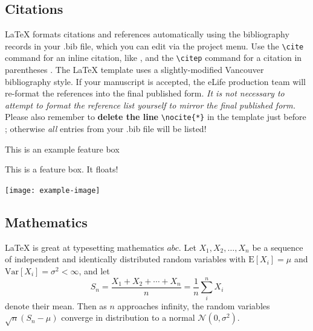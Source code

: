 \documentclass[9pt,lineno]{elife}
\begin{document}
\subsection{Citations}

LaTeX formats citations and references automatically using the bibliography records in your .bib file, which you can edit via the project menu. Use the \verb|\cite| command for an inline citation, like \cite{Aivazian917}, and the \verb|\citep| command for a citation in parentheses \citep{Aivazian917}. The LaTeX template uses a slightly-modified Vancouver bibliography style. If your manuscript is accepted, the eLife production team will re-format the references into the final published form. \emph{It is not necessary to attempt to format the reference list yourself to mirror the final published form.} Please also remember to \textbf{delete the line} \verb|\nocite{*}| in the template just before \verb||; otherwise \emph{all} entries from your .bib file will be listed! 

\begin{featurebox}
\caption{This is an example feature box}
\label{box:simple}
This is a feature box. It floats!
\medskip

\texttt{[image: example-image]}

\lipsum[1]
\end{featurebox}

\subsection{Mathematics}

\LaTeX{} is great at typesetting mathematics $abc$. Let $X_1, X_2, \ldots, X_n$ be a sequence of independent and identically distributed random variables with $\text{E}[X_i] = \mu$ and $\text{Var}[X_i] = \sigma^2 < \infty$, and let
\begin{equation}
\label{eq:CLT}
S_n = \frac{X_1 + X_2 + \cdots + X_n}{n}
      = \frac{1}{n}\sum_{i}^{n} X_i
\end{equation}
denote their mean. Then as $n$ approaches infinity, the random variables $\sqrt{n}(S_n - \mu)$ converge in distribution to a normal $\mathcal{N}(0, \sigma^2)$.

\lipsum[3] 
\end{document}
